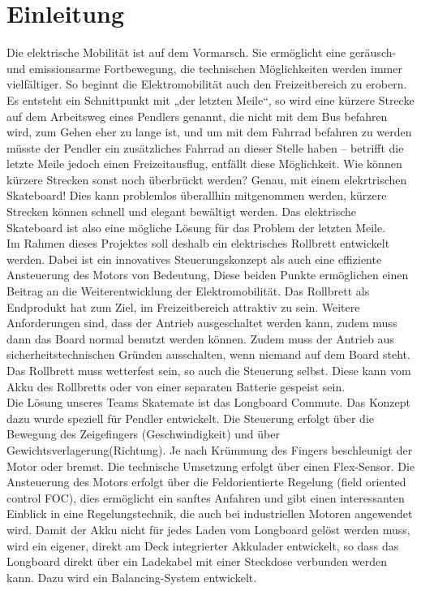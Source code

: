 \chapter{Einleitung}
Die elektrische Mobilität ist auf dem Vormarsch. Sie ermöglicht eine geräusch- und emissionsarme Fortbewegung, die technischen Möglichkeiten werden immer vielfältiger. So beginnt die Elektromobilität auch den Freizeitbereich zu erobern. Es entsteht ein Schnittpunkt mit „der letzten Meile“, so wird eine kürzere Strecke auf dem Arbeitsweg eines Pendlers genannt, die nicht mit dem Bus befahren wird, zum Gehen eher zu lange ist, und um mit dem Fahrrad befahren zu werden müsste der Pendler ein zusätzliches Fahrrad an dieser Stelle haben – betrifft die letzte Meile jedoch einen Freizeitausflug, entfällt diese Möglichkeit. Wie können kürzere Strecken sonst noch überbrückt werden? Genau, mit einem elekrtrischen Skateboard! Dies kann problemlos überallhin mitgenommen werden, kürzere Strecken können schnell und elegant bewältigt werden. Das elektrische Skateboard ist also eine mögliche Lösung für das Problem der letzten Meile. \\
Im Rahmen dieses Projektes soll deshalb ein elektrisches Rollbrett entwickelt werden. Dabei ist ein innovatives Steuerungskonzept als auch eine effiziente Ansteuerung des Motors von Bedeutung, Diese beiden Punkte ermöglichen einen Beitrag an die Weiterentwicklung der Elektromobilität. Das Rollbrett als Endprodukt hat zum Ziel, im Freizeitbereich attraktiv zu sein. 
Weitere Anforderungen sind, dass der Antrieb ausgeschaltet werden kann, zudem muss dann das Board normal benutzt werden können. Zudem muss der Antrieb aus sicherheitstechnischen Gründen ausschalten, wenn niemand auf dem Board steht. Das Rollbrett muss wetterfest sein, so auch die Steuerung selbst. Diese kann vom Akku des Rollbretts oder von einer separaten Batterie gespeist sein.  \\
Die Lösung unseres Teams Skatemate ist das Longboard Commute. Das Konzept dazu wurde speziell für Pendler entwickelt. Die Steuerung erfolgt über die Bewegung des Zeigefingers (Geschwindigkeit) und über Gewichtsverlagerung(Richtung). Je nach Krümmung des Fingers beschleunigt der Motor oder bremst. Die technische Umsetzung erfolgt über einen Flex-Sensor. Die Ansteuerung des Motors erfolgt über die Feldorientierte Regelung (field oriented control FOC), dies ermöglicht ein sanftes Anfahren und gibt einen interessanten Einblick in eine Regelungstechnik, die auch bei industriellen Motoren angewendet wird. Damit der Akku nicht für jedes Laden vom Longboard gelöst werden muss, wird ein eigener, direkt am Deck integrierter Akkulader entwickelt, so dass das Longboard direkt über ein Ladekabel mit einer Steckdose verbunden werden kann. Dazu wird ein Balancing-System entwickelt.
